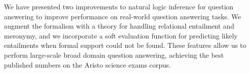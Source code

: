 We have presented two improvements to natural logic inference for question answering
  to improve performance on real-world question answering tasks.
We augment the formalism with a theory for handling relational entailment and meronymy,
  and we incorporate a soft evaluation function for predicting likely entailments when
  formal support could not be found.
These features allow us to perform large-scale broad domain question answering,
  achieving the best published numbers on the Aristo science exams corpus.

